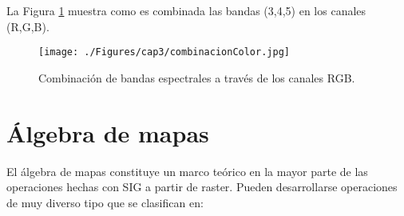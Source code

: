  La Figura \ref{fig:combinacionColor} muestra como es combinada las bandas (3,4,5) en los canales (R,G,B).
  \begin{figure}[H]
  	\centering
  	\texttt{[image: ./Figures/cap3/combinacionColor.jpg]}
  	\caption{Combinaci\'on de bandas espectrales a trav\'es de los canales RGB.}
  	\label{fig:combinacionColor}
  \end{figure}

\section{\'Algebra de mapas}
El \'algebra de mapas constituye un marco te\'orico en la mayor parte de las operaciones hechas con SIG a partir de raster. Pueden desarrollarse operaciones de muy diverso tipo que se clasifican \cite{tomlin1990map} en:
